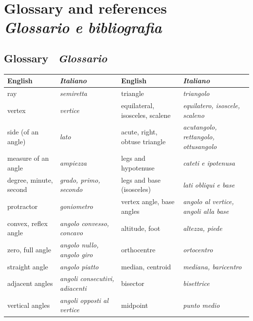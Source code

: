 \documentclass[10pt,a4paper,oneside]{book}
\newcommand{\bichapter}[2]{%
  \chapter[#1 \textperiodcentered\ #2]{#1\\[2pt]{\color{itgreen}\itshape #2}}}
\begin{document}

\bichapter{Glossary and references}{Glossario e bibliografia}\label{app:glossary}

\section*{Glossary \textperiodcentered\ {\color{itgreen}\itshape Glossario}}
{\small
\renewcommand{\arraystretch}{1.12}
\begin{tabularx}{\textwidth}{@{}>{\raggedright\arraybackslash}X >{\raggedright\arraybackslash\itshape\leavevmode\color{itgreen}}X | >{\raggedright\arraybackslash}X >{\raggedright\arraybackslash\itshape\leavevmode\color{itgreen}}X@{}}
\toprule
\rowcolor{white}
\textbf{English} & \textbf{\upshape Italiano} & \textbf{English} & \textbf{\upshape Italiano}\\
\midrule
ray                     & semiretta                  & triangle                  & triangolo\\
vertex                  & vertice                    & equilateral, isosceles, scalene & equilatero, isoscele, scaleno\\
side (of an angle)      & lato                       & acute, right, obtuse triangle & acutangolo, rettangolo, ottusangolo\\
measure of an angle     & ampiezza                   & legs and hypotenuse       & cateti e ipotenusa\\
degree, minute, second  & grado, primo, secondo      & legs and base (isosceles) & lati obliqui e base\\
protractor              & goniometro                 & vertex angle, base angles & angolo al vertice, angoli alla base\\
convex, reflex angle    & angolo convesso, concavo   & altitude, foot            & altezza, piede\\
zero, full angle        & angolo nullo, angolo giro  & orthocentre               & ortocentro\\
straight angle          & angolo piatto              & median, centroid          & mediana, baricentro\\
adjacent angles         & angoli consecutivi, adiacenti & bisector               & bisettrice\\
vertical angles         & angoli opposti al vertice  & midpoint                  & punto medio\\

\end{tabularx}}
\end{document}
